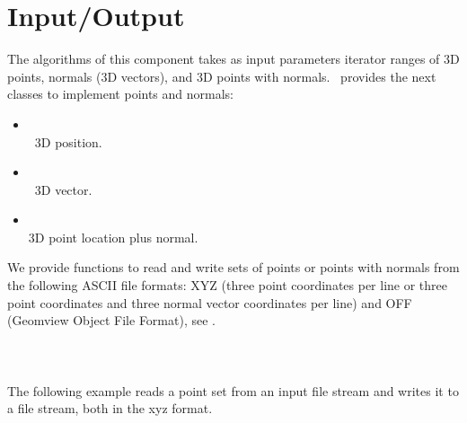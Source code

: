 \section{Input/Output}

The algorithms of this component takes as input parameters iterator ranges of 3D points, normals (3D vectors), and 3D points with normals. \cgal\ provides the next classes to implement points and normals:

\begin{itemize}
\item {} \\
\cgal\ 3D position.
\item {} \\
\cgal\ 3D vector.
\item {} \\
3D point location plus normal.
\end{itemize}

We provide functions to read and write sets of points or points with normals from the following ASCII file formats: XYZ (three point coordinates  per line or three point coordinates and three normal vector coordinates  per line) and OFF (Geomview Object File Format), see \cite{cgal-off-format}. %
  \\
  \\
  \\
  \\

The following example reads a point set from an input file stream and writes it to a file stream, both in the xyz format.
